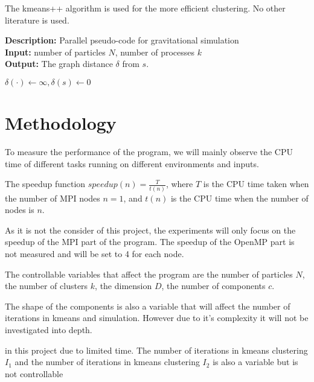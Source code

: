 \documentclass[12pt]{article}
\begin{document}
The kmeans++ algorithm is used for the more efficient clustering. No other literature
is used.


\textbf{Description:} Parallel pseudo-code for gravitational simulation \\
\textbf{Input:} number of particles $N$, number of processes $k$\\
\textbf{Output:} The graph distance $\delta$ from $s$.

\begin{algorithmic}[1]
  \State $\delta(\cdot) \gets \infty, \delta(s) \gets 0$
  \EndFor
\EndProcedure
\end{algorithmic}

\section{Methodology}

To measure the performance of the program, we will mainly observe the CPU time
of different tasks running on different environments and inputs.

The speedup function $speedup(n) = \frac{T}{t(n)}$,
where $T$ is the CPU time taken when the number of MPI nodes $n=1$,
and $t(n)$ is the CPU time when the number of nodes is $n$.

As it is not the consider of this project, the experiments will only focus on
the speedup of the MPI part of the program. The speedup of the OpenMP part
is not measured and will be set to 4 for each node.

The controllable variables that affect the program are
the number of particles $N$, the number of clusters $k$,
the dimension $D$, the number of components $c$.

The shape of the components is also a variable that will
affect the number of iterations in kmeans and simulation.
However due to it's complexity it will not be investigated
into depth.

in this project due to limited time.
The number of iterations in kmeans clustering $I_1$
and the number of iterations in kmeans clustering $I_2$
is also a variable but is not controllable
\end{document}
